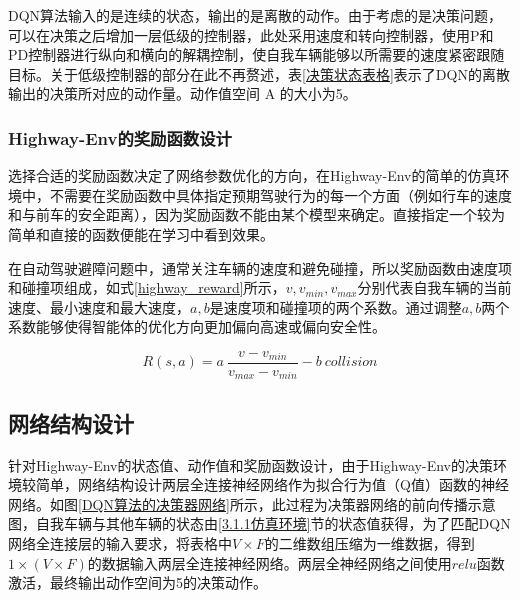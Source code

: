DQN算法输入的是连续的状态，输出的是离散的动作。由于考虑的是决策问题，可以在决策之后增加一层低级的控制器，此处采用速度和转向控制器，使用P和PD控制器进行纵向和横向的解耦控制，使自我车辆能够以所需要的速度紧密跟随目标。关于低级控制器的部分在此不再赘述，表\ref{决策状态表格}表示了DQN的离散输出的决策所对应的动作量。动作值空间 A 的大小为5。

\begin{table}[htbp]
    \caption{决策状态表格}\label{决策状态表格}
    \centering
    \renewcommand\arraystretch{1.5}
\end{table}

\subsubsection{Highway-Env的奖励函数设计}

选择合适的奖励函数决定了网络参数优化的方向，在Highway-Env的简单的仿真环境中，不需要在奖励函数中具体指定预期驾驶行为的每一个方面（例如行车的速度和与前车的安全距离），因为奖励函数不能由某个模型来确定。直接指定一个较为简单和直接的函数便能在学习中看到效果。

在自动驾驶避障问题中，通常关注车辆的速度和避免碰撞，所以奖励函数由速度项和碰撞项组成，如式\ref{highway_reward}所示，$v,v_{min},v_{max}$分别代表自我车辆的当前速度、最小速度和最大速度，$a,b$是速度项和碰撞项的两个系数。通过调整$a,b$两个系数能够使得智能体的优化方向更加偏向高速或偏向安全性。

\begin{equation}\label{highway_reward}
    R(s,a) = a\ \frac{v-v_{min}}{v_{max} - v_{min}} - b\ collision
\end{equation}

\subsection{网络结构设计} %

针对Highway-Env的状态值、动作值和奖励函数设计，由于Highway-Env的决策环境较简单，网络结构设计两层全连接神经网络作为拟合行为值（Q值）函数的神经网络。如图\ref{DQN算法的决策器网络}所示，此过程为决策器网络的前向传播示意图，自我车辆与其他车辆的状态由\ref{3.1.1仿真环境}节的状态值获得，为了匹配DQN网络全连接层的输入要求，将表格中$V \times F$的二维数组压缩为一维数据，得到$1\times(V \times F)$的数据输入两层全连接神经网络。两层全神经网络之间使用$relu$函数激活，最终输出动作空间为5的决策动作。

